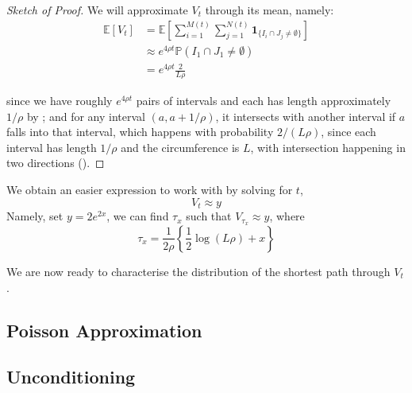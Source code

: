 \documentclass{article}
\begin{document}
\begin{proof}[Sketch of Proof]
    We will approximate $V_t$ through its mean, namely:
    \begin{align*}
        \mathbb{E}[V_t] &= \mathbb{E}\left[\sum_{i=1}^{M(t)}\sum_{j=1}^{N(t)}\mathbf{1}_{\{I_i\cap J_j\neq \emptyset\}}\right] \\
        &\approx e^{4\rho t} \mathbb{P}(I_1\cap J_1\neq \emptyset)\\
        &= e^{4\rho t} \frac{2}{L\rho}
    \end{align*}

    since we have roughly $e^{4\rho t}$ pairs of intervals and each has length approximately $1/\rho$ by ; and for any interval $(a, a+1/\rho)$, it intersects with another interval if $a$ falls into that interval, which happens with probability $2/(L\rho)$, since each interval has length $1/\rho$ and the circumference is $L$, with intersection happening in two directions ().
\end{proof}

We obtain an easier expression to work with by solving for $t$,  
\begin{equation}
    V_t \approx y
\end{equation}
Namely, set $y=2e^{2x}$, we can find $\tau_x$ such that $V_{\tau_x} \approx y$, where
\begin{equation*}
    \tau_{x}={\frac{1}{2\rho}}\left\{{\frac{1}{2}}\log(L\rho)+x\right\}
\end{equation*}

We are now ready to characterise the distribution of the shortest path through $V_t$.  

\subsection{Poisson Approximation}


\subsection{Unconditioning}





\newpage


\end{document}
